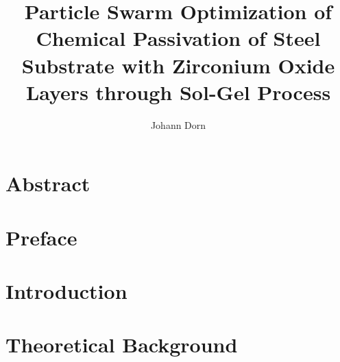 \documentclass[a4paper,twoside]{report}
\title{Particle Swarm Optimization of Chemical Passivation of Steel Substrate with Zirconium Oxide Layers through Sol-Gel Process}
\author{Johann Dorn}
\begin{document}



\chapter*{Abstract}


\chapter*{Preface}


\tableofcontents
\clearpage
\printglossaries
\clearpage

\chapter{Introduction}                                
\label{sec:intro}


%

\chapter{Theoretical Background}
\label{sec:theoretical}


%

\end{document}
